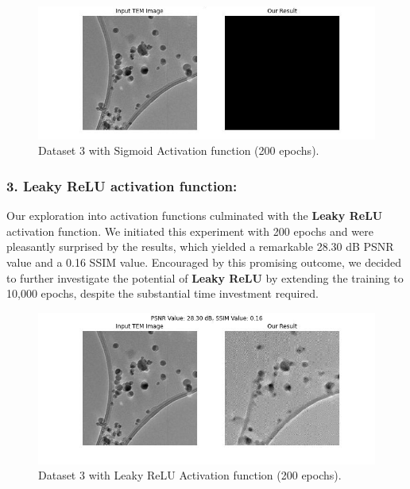 \begin{figure}[H]
    \centering
    \includegraphics[width=1\textwidth]{img/Dataset_3_with_200_epochs_Sigmoid.jpg}
    \caption{Dataset 3 with Sigmoid Activation function (200 epochs).}\label{fig:Dataset_3_with_Sigmoid_200_epochs.jpg}
\end{figure}

\subsubsection{3. Leaky ReLU activation function:}
Our exploration into activation functions culminated with the \textbf{Leaky ReLU} activation function. We initiated this experiment with 200 epochs and were pleasantly surprised by the results, which yielded a remarkable 28.30 dB PSNR value and a 0.16 SSIM value. Encouraged by this promising outcome, we decided to further investigate the potential of \textbf{Leaky ReLU} by extending the training to 10,000 epochs, despite the substantial time investment required.

\begin{figure}[H]
    \centering
    \includegraphics[width=1\textwidth]{img/Dataset_3_with_200_epochs_Leaky_Activation_Function.jpg}
    \caption{Dataset 3 with Leaky ReLU Activation function (200 epochs).}\label{fig:Dataset_3_with_Leaky_ReLU_200_epochs.jpg}
\end{figure}



